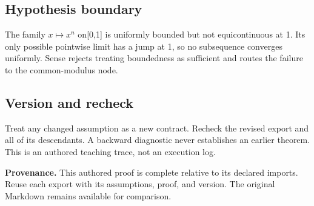 \documentclass[preprint,12pt,aps,pra,showkeys,amsmath,amssymb,superscriptaddress,floatfix]{revtex4-2}
\theoremstyle{definition}
\theoremstyle{remark}
\begin{document}
\subsection{Hypothesis boundary}
The family \(x\mapsto x^{n}\) on{[}0,1{]} is uniformly bounded but not
equicontinuous at 1. Its only possible pointwise limit has a jump at 1,
so no subsequence converges uniformly. Sense rejects treating
boundedness as sufficient and routes the failure to the common-modulus
node.

\subsection{Version and recheck}
Treat any changed assumption as a new contract. Recheck the revised
export and all of its descendants. A backward diagnostic never
establishes an earlier theorem. This is an authored teaching trace, not
an execution log.

\par\medskip\begingroup\small\linespread{1.0}\selectfont\noindent\textbf{Provenance.} This authored proof is complete relative to its declared imports. Reuse
each export with its assumptions, proof, and version. The original
Markdown remains available for comparison.
\par\endgroup
\end{document}
